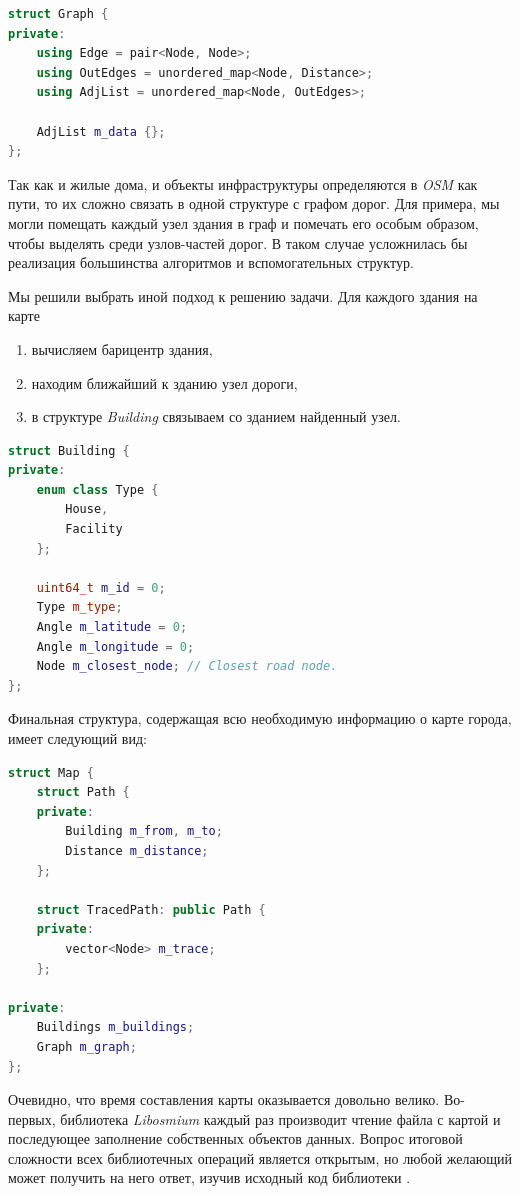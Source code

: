 \documentclass[11pt]{article}
\begin{document}
 	\begin{lstlisting}[language=C++]
struct Graph {
private:
	using Edge = pair<Node, Node>;
	using OutEdges = unordered_map<Node, Distance>;
	using AdjList = unordered_map<Node, OutEdges>;

	AdjList m_data {};
};
 	\end{lstlisting}
 	
 	Так как и жилые дома, и объекты инфраструктуры определяются в \textit{OSM} как пути, то их сложно связать в одной структуре с графом дорог.
 	Для примера, мы могли помещать каждый узел здания в граф и помечать его особым образом, чтобы выделять среди узлов-частей дорог.
 	В таком случае усложнилась бы реализация большинства алгоритмов и вспомогательных структур.
 	
 	Мы решили выбрать иной подход к решению задачи.
	Для каждого здания на карте
	\begin{enumerate}
	\item вычисляем барицентр здания,
	\item находим ближайший к зданию узел дороги,
	\item в структуре \textit{Building} связываем со зданием найденный узел.
	\end{enumerate}
	
	\begin{lstlisting}[language=C++]
struct Building {
private:
	enum class Type {
		House,
		Facility
	};

	uint64_t m_id = 0;
	Type m_type;
	Angle m_latitude = 0;
	Angle m_longitude = 0;
	Node m_closest_node; // Closest road node.
};
	\end{lstlisting}
	
	Финальная структура, содержащая всю необходимую информацию о карте города, имеет следующий вид:
	
	\begin{lstlisting}[language=C++]
struct Map {
	struct Path {
	private:
		Building m_from, m_to;
		Distance m_distance;
	};

	struct TracedPath: public Path {
	private:
		vector<Node> m_trace;
	};
	
private:
	Buildings m_buildings;
	Graph m_graph;
};
	\end{lstlisting}
	
	Очевидно, что время составления карты оказывается довольно велико.
	Во-первых, библиотека \textit{Libosmium} каждый раз производит чтение файла с картой и последующее заполнение собственных объектов данных.
	Вопрос итоговой сложности всех библиотечных операций является открытым, но любой желающий может получить на него ответ, изучив исходный код библиотеки \cite{libosm-code}.
	
\end{document}
